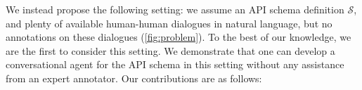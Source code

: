 \documentclass[11pt]{article}
\newcommand{\schema}[0]{\mathcal{S}}
\newcommand{\bdk}[1]{}
\begin{document}

We instead propose the following setting: we assume an API schema definition $\schema$, and plenty of available human-human dialogues in natural language, but no annotations on these dialogues (\autoref{fig:problem}). To the best of our knowledge, we are the first to consider this setting.
We demonstrate that one can develop a conversational agent for the API schema in this setting without any assistance from an expert annotator.  
Our contributions are as follows:
\end{document}
